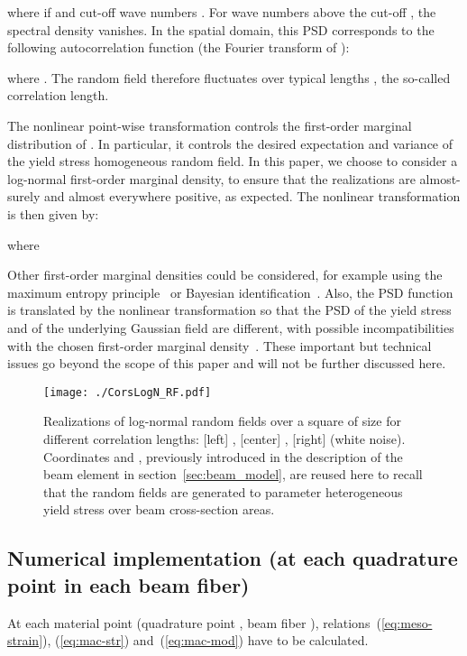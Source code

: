 \documentclass[12p]{amsart}
\begin{document}
where  if  and cut-off wave numbers . For wave numbers above the cut-off , the spectral density vanishes. In the spatial domain, this PSD corresponds to the following autocorrelation function (the Fourier transform of ):

where . The random field  therefore fluctuates over typical lengths , the so-called correlation length.

The nonlinear point-wise transformation  controls the first-order marginal distribution of . In particular, it controls the desired expectation  and variance  of the yield stress homogeneous random field. In this paper, we choose to consider a log-normal first-order marginal density, to ensure that the realizations are almost-surely and almost everywhere positive, as expected. The nonlinear transformation is then given by:

where


Other first-order marginal densities could be considered, for example using the maximum entropy principle~\cite{Shannon1948, Udwadia1989, Soize2000, Cottereau2007, Cottereau2008} or Bayesian identification~\cite{Beck1998, Howson2005}. Also, the PSD function is translated by the nonlinear transformation  so that the PSD of the yield stress and of the underlying Gaussian field are different, with possible incompatibilities with the chosen first-order marginal density~\cite{Grigoriu1998, Puig2004, ShiDeo2013}. These important but technical issues go beyond the scope of this paper and will not be further discussed here.

\begin{figure*}[ht]
  \texttt{[image: ./CorsLogN\_RF.pdf]}
\caption{Realizations of log-normal random fields over a square of size  for different correlation lengths: [left] , [center] , [right]  (white noise). Coordinates  and , previously introduced in the description of the beam element in section~\ref{sec:beam_model}, are reused here to recall that the random fields are generated to parameter heterogeneous yield stress over beam cross-section areas.}
\label{fig:3RFs}
\end{figure*}

\subsection{Numerical implementation (at each quadrature point in each beam fiber)} \label{sec:num-RF}
At each material point  (quadrature point , beam fiber ), relations~(\ref{eq:meso-strain}), (\ref{eq:mac-str}) and~(\ref{eq:mac-mod}) have to be calculated.
\end{document}
